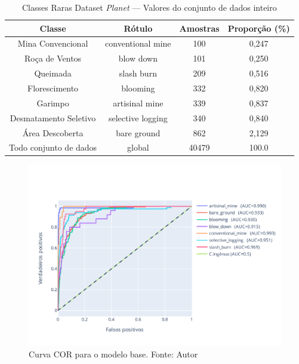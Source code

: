 \begin{table}[h!]
    \caption{Classes Raras Dataset \textit{Planet} — Valores do conjunto de dados inteiro}
    \centering
\begin{tabular}{*{4}{c}}
    \toprule
    Classe                  &            Rótulo &  Amostras      &  Proporção (\%) \\
    \midrule
    Mina Convencional       & conventional mine &        100     &       0,247 \\
    Roça de Ventos          &         blow down &        101     &       0,250 \\
    Queimada                &        slash burn &        209     &       0,516 \\
    Florescimento           &          blooming &        332     &       0,820 \\
    Garimpo                 &    artisinal mine &        339     &       0,837 \\
    Desmatamento Seletivo   & selective logging &        340     &       0,840 \\
    Área Descoberta         &       bare ground &        862     &       2,129 \\
    Todo conjunto de dados  &            global &        40479   &       100.0 \\
    \bottomrule
\end{tabular}
\label{table:Classes raras}
\end{table}

\begin{figure}[!ht]
    \centering
    \includegraphics[width=0.8\columnwidth]{Imagens/results/rsp-resnet-50_planet_pt/Curva COR para classes raras.pdf}
    \caption{ Curva COR para o modelo base. Fonte: Autor}
   \label{fig:CurvaCORResnet50}
\end{figure} 

